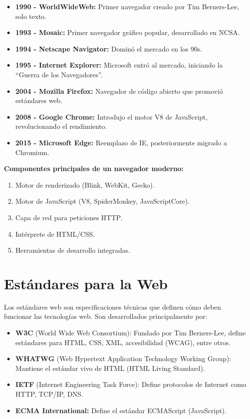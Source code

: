 \documentclass[12pt,letterpaper]{article}
\begin{document}
\begin{itemize}
    \item \textbf{1990 - WorldWideWeb:} Primer navegador creado por Tim Berners-Lee, solo texto.
    \item \textbf{1993 - Mosaic:} Primer navegador gr\'afico popular, desarrollado en NCSA.
    \item \textbf{1994 - Netscape Navigator:} Domin\'o el mercado en los 90s.
    \item \textbf{1995 - Internet Explorer:} Microsoft entr\'o al mercado, iniciando la ``Guerra de los Navegadores''.
    \item \textbf{2004 - Mozilla Firefox:} Navegador de c\'odigo abierto que promovi\'o est\'andares web.
    \item \textbf{2008 - Google Chrome:} Introdujo el motor V8 de JavaScript, revolucionando el rendimiento.
    \item \textbf{2015 - Microsoft Edge:} Reemplazo de IE, posteriormente migrado a Chromium.
\end{itemize}

\textbf{Componentes principales de un navegador moderno:}
\begin{enumerate}
    \item Motor de renderizado (Blink, WebKit, Gecko).
    \item Motor de JavaScript (V8, SpiderMonkey, JavaScriptCore).
    \item Capa de red para peticiones HTTP.
    \item Int\'erprete de HTML/CSS.
    \item Herramientas de desarrollo integradas.
\end{enumerate}

\section{Est\'andares para la Web}

Los est\'andares web son especificaciones t\'ecnicas que definen c\'omo deben funcionar las tecnolog\'ias web. Son desarrollados principalmente por:

\begin{itemize}
    \item \textbf{W3C} (World Wide Web Consortium): Fundado por Tim Berners-Lee, define est\'andares para HTML, CSS, XML, accesibilidad (WCAG), entre otros.
    \item \textbf{WHATWG} (Web Hypertext Application Technology Working Group): Mantiene el est\'andar vivo de HTML (HTML Living Standard).
    \item \textbf{IETF} (Internet Engineering Task Force): Define protocolos de Internet como HTTP, TCP/IP, DNS.
    \item \textbf{ECMA International:} Define el est\'andar ECMAScript (JavaScript).
\end{itemize}
\end{document}
